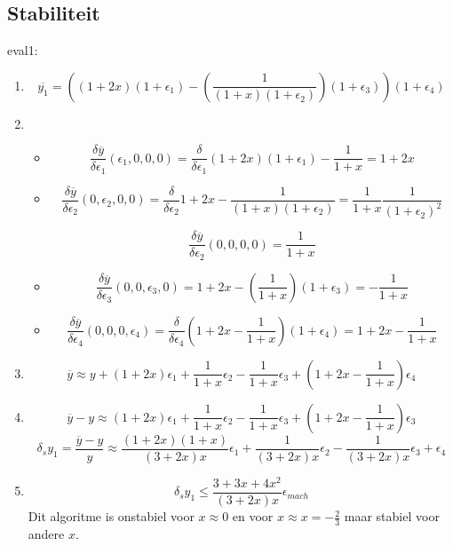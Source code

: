 \documentclass[12pt,a4paper]{article}
\begin{document}
\subsection{Stabiliteit}
eval1:
\begin{enumerate}
\item
\[
\overline{y_1} = \left((1+2x)(1+\epsilon_1)-\left(\frac{1}{(1+x)(1+\epsilon_2)}\right)(1+\epsilon_3)\right)(1+\epsilon_4)
\]
\item
\begin{itemize}
\item
\[
\frac{\delta\overline{y}}{\delta\epsilon_1}(\epsilon_1,0,0,0)
= \frac{\delta}{\delta\epsilon_1}(1+2x)(1+\epsilon_1)-\frac{1}{1+x}
= 1+2x
\]

\item
\[
\frac{\delta\overline{y}}{\delta\epsilon_2}(0,\epsilon_2,0,0)
= \frac{\delta}{\delta\epsilon_2}1+2x-\frac{1}{(1+x)(1+\epsilon_2)}=\frac{1}{1+x}\frac{1}{(1+\epsilon_2)^2}
\]

\[
\frac{\delta\overline{y}}{\delta\epsilon_2}(0,0,0,0)
= \frac{1}{1+x}
\]

\item
\[
\frac{\delta\overline{y}}{\delta\epsilon_3}(0,0,\epsilon_3,0)
= 1+2x-(\frac{1}{1+x})(1+\epsilon_3)
= -\frac{1}{1+x}
\]

\item
\[
\frac{\delta\overline{y}}{\delta\epsilon_4}(0,0,0,\epsilon_4)
= \frac{\delta}{\delta\epsilon_4}(1+2x-\frac{1}{1+x})(1+\epsilon_4)
= 1+2x-\frac{1}{1+x}
\]

\end{itemize}

\item
\[
\overline{y} \approx y
+ (1+2x)\epsilon_1
+ \frac{1}{1+x}\epsilon_2
- \frac{1}{1+x}\epsilon_3
+ \left(1+2x-\frac{1}{1+x}\right)\epsilon_4
\]


\item
\[
\overline{y} - y
\approx
  (1+2x)\epsilon_1
+ \frac{1}{1+x}\epsilon_2
- \frac{1}{1+x}\epsilon_3
+ \left(1+2x-\frac{1}{1+x}\right)\epsilon_3
\]
\[
\delta_{s}y_1 =
\frac{\overline{y} - y}{y}
\approx 
  \frac{(1+2x)(1+x)}{(3+2x)x}\epsilon_1
+ \frac{1}{(3+2x)x}\epsilon_2
- \frac{1}{(3+2x)x}\epsilon_3
+ \epsilon_4
\]
\item
\[
\delta_{s}y_1 \le  \frac{3+3x+4x^2}{(3+2x)x}\epsilon_{mach}
\]
Dit algoritme is onstabiel voor $x\approx 0$ en voor $x\approx x = -\frac{2}{3}$ maar stabiel voor andere $x$.

\end{enumerate}
\end{document}
